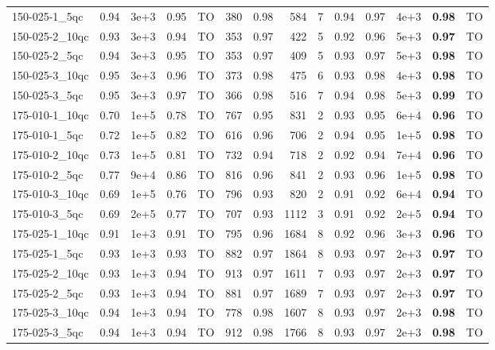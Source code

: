 \documentclass[twoside]{article}
\begin{document}
\begin{table}[h]
{\begin{tabular}{l|rccr|rcrrccrcr}
				150-025-1\_5qc & 0.94 & 3e+3 & 0.95 & TO & 380 & 0.98 & 584 & 7 & 0.94 & 0.97 & 4e+3 & \textbf{0.98} & TO \\
				150-025-2\_10qc & 0.93 & 3e+3 & 0.94 & TO & 353 & 0.97 & 422 & 5 & 0.92 & 0.96 & 5e+3 & \textbf{0.97} & TO \\
				150-025-2\_5qc & 0.94 & 3e+3 & 0.95 & TO & 353 & 0.97 & 409 & 5 & 0.93 & 0.97 & 5e+3 & \textbf{0.98} & TO \\
				150-025-3\_10qc & 0.95 & 3e+3 & 0.96 & TO & 373 & 0.98 & 475 & 6 & 0.93 & 0.98 & 4e+3 & \textbf{0.98} & TO \\
				150-025-3\_5qc & 0.95 & 3e+3 & 0.97 & TO & 366 & 0.98 & 516 & 7 & 0.94 & 0.98 & 5e+3 & \textbf{0.99} & TO \\
				175-010-1\_10qc & 0.70 & 1e+5 & 0.78 & TO & 767 & 0.95 & 831 & 2 & 0.93 & 0.95 & 6e+4 & \textbf{0.96} & TO \\
				175-010-1\_5qc & 0.72 & 1e+5 & 0.82 & TO & 616 & 0.96 & 706 & 2 & 0.94 & 0.95 & 1e+5 & \textbf{0.98} & TO \\
				175-010-2\_10qc & 0.73 & 1e+5 & 0.81 & TO & 732 & 0.94 & 718 & 2 & 0.92 & 0.94 & 7e+4 & \textbf{0.96} & TO \\
				175-010-2\_5qc & 0.77 & 9e+4 & 0.86 & TO & 816 & 0.96 & 841 & 2 & 0.93 & 0.96 & 1e+5 & \textbf{0.98} & TO \\
				175-010-3\_10qc & 0.69 & 1e+5 & 0.76 & TO & 796 & 0.93 & 820 & 2 & 0.91 & 0.92 & 6e+4 & \textbf{0.94} & TO \\
				175-010-3\_5qc & 0.69 & 2e+5 & 0.77 & TO & 707 & 0.93 & 1112 & 3 & 0.91 & 0.92 & 2e+5 & \textbf{0.94} & TO \\
				175-025-1\_10qc & 0.91 & 1e+3 & 0.91 & TO & 795 & 0.96 & 1684 & 8 & 0.92 & 0.96 & 3e+3 & \textbf{0.96} & TO \\
				175-025-1\_5qc & 0.93 & 1e+3 & 0.93 & TO & 882 & 0.97 & 1864 & 8 & 0.93 & 0.97 & 2e+3 & \textbf{0.97} & TO \\
				175-025-2\_10qc & 0.93 & 1e+3 & 0.94 & TO & 913 & 0.97 & 1611 & 7 & 0.93 & 0.97 & 2e+3 & \textbf{0.97} & TO \\
				175-025-2\_5qc & 0.93 & 1e+3 & 0.94 & TO & 881 & 0.97 & 1689 & 7 & 0.93 & 0.97 & 2e+3 & \textbf{0.97} & TO \\
				175-025-3\_10qc & 0.94 & 1e+3 & 0.94 & TO & 778 & 0.98 & 1607 & 8 & 0.93 & 0.97 & 2e+3 & \textbf{0.98} & TO \\
				175-025-3\_5qc & 0.94 & 1e+3 & 0.94 & TO & 912 & 0.98 & 1766 & 8 & 0.93 & 0.97 & 2e+3 & \textbf{0.98} & TO \\

\end{tabular}}
\end{table}
\end{document}

